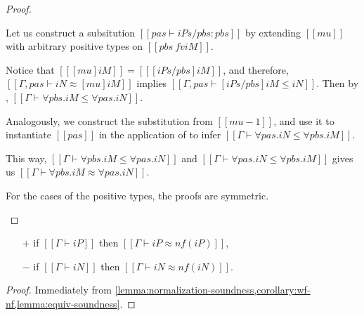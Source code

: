 \begin{proof}
\begin{caseof}
      Let us construct a subsitution $[[pas ⊢ iPs/pbs : pbs]]$ by
      extending $[[mu]]$ with arbitrary positive types on $[[{pbs} \ fv iM]]$.

      Notice that $[[ [mu]iM ]] = [[ [iPs/pbs]iM ]]$, and therefore,
      $[[Γ, pas ⊢ iN ≈ [mu] iM]]$ implies $[[Γ, pas ⊢ [iPs/pbs]iM ≤ iN]]$. Then by
      , $[[Γ ⊢ ∀pbs.iM ≤ ∀pas.iN]]$.

      Analogously, we construct the substitution from $[[mu-1]]$, and use it to
      instantiate $[[pas]]$ in the application of
       to infer $[[Γ ⊢ ∀pas.iN ≤ ∀pbs.iM]]$.

      This way, $[[Γ ⊢ ∀pbs.iM ≤ ∀pas.iN]]$ and $[[Γ ⊢ ∀pas.iN ≤ ∀pbs.iM]]$
      gives us $[[Γ ⊢ ∀pbs.iM ≈ ∀pas.iN]]$.

    \item For the cases of the positive types, the proofs are symmetric.
  \end{caseof}
\end{proof}

\begin{corollary} 
  \label{corollary:nf-sound-wrt-subt-equiv}
  \hfill
  \begin{itemize}
    \item [$+$] if $[[Γ ⊢ iP]]$ then $[[Γ ⊢ iP ≈ nf(iP)]]$,
    \item [$-$] if $[[Γ ⊢ iN]]$ then $[[Γ ⊢ iN ≈ nf(iN)]]$.
  \end{itemize}
\end{corollary}
\begin{proof}
  Immediately from \cref{lemma:normalization-soundness,corollary:wf-nf,lemma:equiv-soundness}.
\end{proof}


